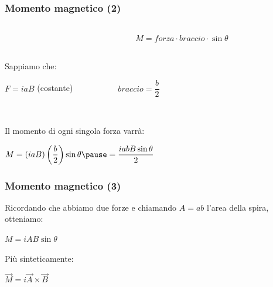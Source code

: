 \documentclass[]{beamer}
\theoremstyle{plain}
\begin{document}
\begin{frame}
\frametitle{Momento magnetico (2)}
\begin{columns}
\begin{column}{0.4\textwidth}
\begin{figure}
\end{figure}
\end{column}
\begin{column}{0.4\textwidth}
\begin{center}
$ M = forza \cdot braccio \cdot \sin\theta $
\end{center}
\end{column}
\end{columns}\pause

Sappiamo che:
\begin{center}
$ F = iaB $ (costante)~~~~~~~~\pause~~~$ braccio = \dfrac{b}{2} $
\end{center}\pause

~

Il momento di ogni \alert{singola} forza varrà:
\begin{center}
$ M = (iaB)\left(\dfrac{b}{2}\right)\sin\theta \pause= \dfrac{iabB\sin\theta}{2}$
\end{center}
\end{frame}

\begin{frame}
\frametitle{Momento magnetico (3)}
Ricordando che abbiamo \alert<1>{due forze} e chiamando $ A = ab $ l'area della spira, otteniamo:
\begin{center}
\colorbox{blue!30}{$ M = i A B \sin\theta $}
\end{center}\pause
Più sinteticamente:
\begin{center}
\colorbox{blue!30}{$ \vec{M} = i \vec{A}\times \vec{B} $}
\end{center}
\end{frame}
\end{document}
